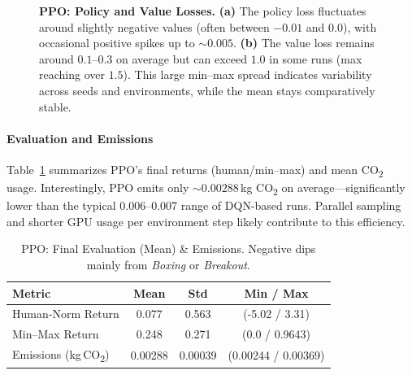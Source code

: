 \begin{figure}[htbp]
	\centering
	\quad
	\caption{\textbf{PPO: Policy and Value Losses.}
		\textbf{(a)} The policy loss fluctuates around slightly negative values 
		(often between $-0.01$ and $0.0$), with occasional positive spikes up to $\sim0.005$. 
		\textbf{(b)} The value loss remains around $0.1$--$0.3$ on average but can exceed $1.0$ in some runs 
		(max reaching over $1.5$). This large min--max spread indicates variability across seeds and environments, 
		while the mean stays comparatively stable.}
	\label{fig:ppo_pol_val_losses}
\end{figure}

\paragraph{Evaluation and Emissions}
Table~\ref{tab:ppo_eval} summarizes PPO’s final returns (human/min--max) and mean CO\textsubscript{2} usage. 
Interestingly, PPO emits only $\sim0.00288$\,kg CO\textsubscript{2} on average—significantly lower than 
the typical 0.006--0.007 range of DQN-based runs. 
Parallel sampling and shorter GPU usage per environment step likely contribute to this efficiency.

\begin{table}[htbp]
	\caption{PPO: Final Evaluation (Mean) \& Emissions. Negative dips mainly from \emph{Boxing} or \emph{Breakout}.}
	\label{tab:ppo_eval}
	\centering
	\begin{tabular}{lccc}
		\toprule
		\textbf{Metric} & \textbf{Mean} & \textbf{Std} & \textbf{Min / Max}\\
		\midrule
		Human‐Norm Return & 0.077 & 0.563 & (-5.02 / 3.31)\\
		Min--Max Return   & 0.248 & 0.271 & (0.0 / 0.9643)\\
		Emissions (kg\,CO\textsubscript{2}) & 0.00288 & 0.00039 & (0.00244 / 0.00369)\\
		\bottomrule
	\end{tabular}
\end{table}

